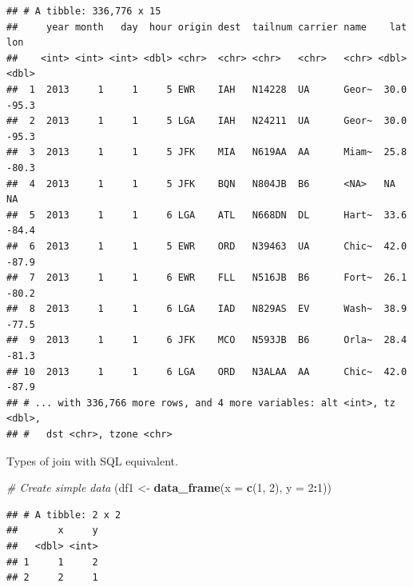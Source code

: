 \documentclass[]{book}
\newenvironment{Shaded}{\begin{snugshade}}{\end{snugshade}}
\newcommand{\CommentTok}[1]{\textcolor[rgb]{0.56,0.35,0.01}{\textit{#1}}}
\newcommand{\DataTypeTok}[1]{\textcolor[rgb]{0.13,0.29,0.53}{#1}}
\newcommand{\DecValTok}[1]{\textcolor[rgb]{0.00,0.00,0.81}{#1}}
\newcommand{\KeywordTok}[1]{\textcolor[rgb]{0.13,0.29,0.53}{\textbf{#1}}}
\newcommand{\NormalTok}[1]{#1}
\newcommand{\OperatorTok}[1]{\textcolor[rgb]{0.81,0.36,0.00}{\textbf{#1}}}
\newcommand{\StringTok}[1]{\textcolor[rgb]{0.31,0.60,0.02}{#1}}
\theoremstyle{definition}
\theoremstyle{definition}
\theoremstyle{definition}
\theoremstyle{remark}
\begin{document}
\begin{Shaded}
\end{Shaded}

\begin{verbatim}
## # A tibble: 336,776 x 15
##     year month   day  hour origin dest  tailnum carrier name    lat   lon
##    <int> <int> <int> <dbl> <chr>  <chr> <chr>   <chr>   <chr> <dbl> <dbl>
##  1  2013     1     1     5 EWR    IAH   N14228  UA      Geor~  30.0 -95.3
##  2  2013     1     1     5 LGA    IAH   N24211  UA      Geor~  30.0 -95.3
##  3  2013     1     1     5 JFK    MIA   N619AA  AA      Miam~  25.8 -80.3
##  4  2013     1     1     5 JFK    BQN   N804JB  B6      <NA>   NA    NA  
##  5  2013     1     1     6 LGA    ATL   N668DN  DL      Hart~  33.6 -84.4
##  6  2013     1     1     5 EWR    ORD   N39463  UA      Chic~  42.0 -87.9
##  7  2013     1     1     6 EWR    FLL   N516JB  B6      Fort~  26.1 -80.2
##  8  2013     1     1     6 LGA    IAD   N829AS  EV      Wash~  38.9 -77.5
##  9  2013     1     1     6 JFK    MCO   N593JB  B6      Orla~  28.4 -81.3
## 10  2013     1     1     6 LGA    ORD   N3ALAA  AA      Chic~  42.0 -87.9
## # ... with 336,766 more rows, and 4 more variables: alt <int>, tz <dbl>,
## #   dst <chr>, tzone <chr>
\end{verbatim}

Types of join with SQL equivalent.

\begin{Shaded}
\begin{Highlighting}[]
\CommentTok{# Create simple data}
\NormalTok{(df1 <-}\StringTok{ }\KeywordTok{data_frame}\NormalTok{(}\DataTypeTok{x =} \KeywordTok{c}\NormalTok{(}\DecValTok{1}\NormalTok{, }\DecValTok{2}\NormalTok{), }\DataTypeTok{y =} \DecValTok{2}\OperatorTok{:}\DecValTok{1}\NormalTok{))}
\end{Highlighting}
\end{Shaded}

\begin{verbatim}
## # A tibble: 2 x 2
##       x     y
##   <dbl> <int>
## 1     1     2
## 2     2     1
\end{verbatim}
\end{document}
